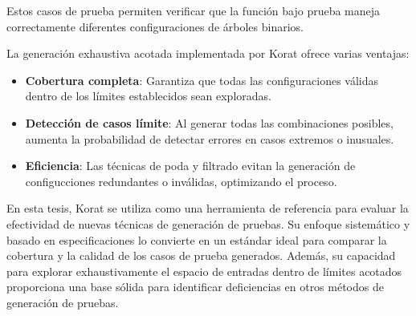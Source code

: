 Estos casos de prueba permiten verificar que la función bajo prueba maneja correctamente diferentes configuraciones de árboles binarios.


La generación exhaustiva acotada implementada por Korat ofrece varias ventajas:
\begin{itemize}
\item \textbf{Cobertura completa}: Garantiza que todas las configuraciones válidas dentro de los límites establecidos sean exploradas.
\item \textbf{Detección de casos límite}: Al generar todas las combinaciones posibles, aumenta la probabilidad de detectar errores en casos extremos o inusuales.
\item \textbf{Eficiencia}: Las técnicas de poda y filtrado evitan la generación de configucciones redundantes o inválidas, optimizando el proceso.
\end{itemize}

En esta tesis, Korat se utiliza como una herramienta de referencia para evaluar la efectividad de nuevas técnicas de generación de pruebas. Su enfoque sistemático y basado en especificaciones lo convierte en un estándar ideal para comparar la cobertura y la calidad de los casos de prueba generados. Además, su capacidad para explorar exhaustivamente el espacio de entradas dentro de límites acotados proporciona una base sólida para identificar deficiencias en otros métodos de generación de pruebas.



